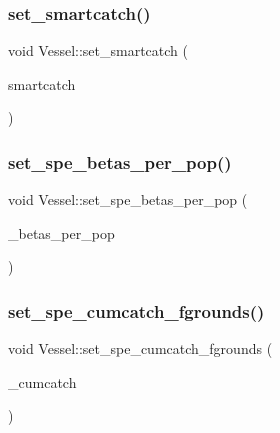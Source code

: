 \subsubsection{\texorpdfstring{set\_smartcatch()}{set\_smartcatch()}}
{\footnotesize\ttfamily void Vessel\+::set\+\_\+smartcatch (\begin{DoxyParamCaption}\item[{\mbox{\hyperlink{classtypes_1_1_node_id}{types\+::\+Node\+Id}}}]{smartcatch }\end{DoxyParamCaption})}

\mbox{\label{class_vessel_a8380add692e6a83c57befa7030cf9462}} 
\subsubsection{\texorpdfstring{set\_spe\_betas\_per\_pop()}{set\_spe\_betas\_per\_pop()}}
{\footnotesize\ttfamily void Vessel\+::set\+\_\+spe\+\_\+betas\+\_\+per\+\_\+pop (\begin{DoxyParamCaption}\item[{const std\+::vector$<$ double $>$ \&}]{\+\_\+betas\+\_\+per\+\_\+pop }\end{DoxyParamCaption})}

\mbox{\label{class_vessel_a9c92e3fce1cb08b5d3a0864c5edaa4f6}} 
\subsubsection{\texorpdfstring{set\_spe\_cumcatch\_fgrounds()}{set\_spe\_cumcatch\_fgrounds()}}
{\footnotesize\ttfamily void Vessel\+::set\+\_\+spe\+\_\+cumcatch\+\_\+fgrounds (\begin{DoxyParamCaption}\item[{const std\+::vector$<$ double $>$ \&}]{\+\_\+cumcatch }\end{DoxyParamCaption})}

\mbox{\label{class_vessel_a5cf4fcf7a7fdd53e71b4915ef41c5e48}} 
